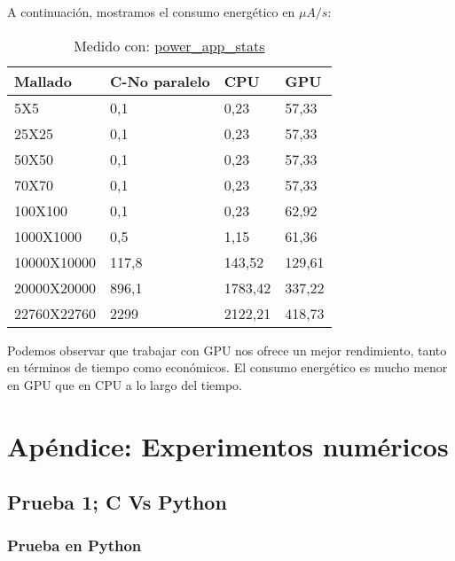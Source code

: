 \begin{ejemplo}
	\newpage
	A continuación, mostramos el consumo energético en $\mu A / s$:
	
	\begin{table}[h]
		\centering
		\begin{tabular}{@{}llll@{}}
			\toprule
			Mallado     & C-No paralelo & CPU     & GPU    \\ \midrule
			5X5         & 0,1           & 0,23    & 57,33  \\
			25X25       & 0,1           & 0,23    & 57,33  \\
			50X50       & 0,1           & 0,23    & 57,33  \\
			70X70       & 0,1           & 0,23    & 57,33  \\
			100X100     & 0,1           & 0,23    & 62,92  \\
			1000X1000   & 0,5           & 1,15    & 61,36  \\
			10000X10000 & 117,8         & 143,52  & 129,61 \\
			20000X20000 & 896,1         & 1783,42 & 337,22 \\
			22760X22760 & 2299          & 2122,21 & 418,73 \\ \bottomrule
		\end{tabular}
	
		\caption{Medido con:  \href{https://github.com/JoseCarlosGarcia95/power_app_stats}{power\_app\_stats}}
	\end{table}

	Podemos observar que trabajar con GPU nos ofrece un mejor rendimiento, tanto en términos de tiempo como económicos. El consumo energético es mucho menor en GPU que en CPU a lo largo del tiempo.
\end{ejemplo}


\section{Apéndice: Experimentos numéricos}

\subsection{Prueba 1; C Vs Python}
\label{prueba:cvspython}

\subsubsection{Prueba en Python}


